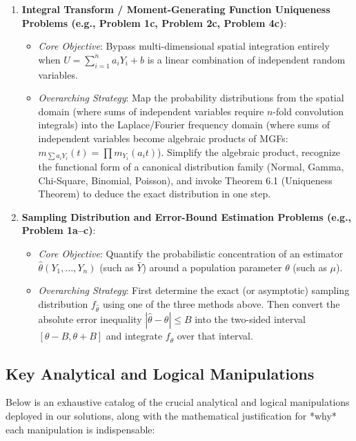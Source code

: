 \documentclass[11pt, letterpaper]{article}
\theoremstyle{definition}
\theoremstyle{remark}
\begin{document}
\begin{enumerate}[label=\textbf{\arabic*.}]
    \item \textbf{Integral Transform / Moment-Generating Function Uniqueness Problems (e.g., Problem 1c, Problem 2c, Problem 4c)}:
    \begin{itemize}
        \item \textit{Core Objective}: Bypass multi-dimensional spatial integration entirely when $U = \sum_{i=1}^n a_i Y_i + b$ is a linear combination of independent random variables.
        \item \textit{Overarching Strategy}: Map the probability distributions from the spatial domain (where sums of independent variables require $n$-fold convolution integrals) into the Laplace/Fourier frequency domain (where sums of independent variables become algebraic products of MGFs: $m_{\sum a_i Y_i}(t) = \prod m_{Y_i}(a_i t)$). Simplify the algebraic product, recognize the functional form of a canonical distribution family (Normal, Gamma, Chi-Square, Binomial, Poisson), and invoke Theorem 6.1 (Uniqueness Theorem) to deduce the exact distribution in one step.
    \end{itemize}

    \item \textbf{Sampling Distribution and Error-Bound Estimation Problems (e.g., Problem 1a--c)}:
    \begin{itemize}
        \item \textit{Core Objective}: Quantify the probabilistic concentration of an estimator $\hat{\theta}(Y_1, \dots, Y_n)$ (such as $\bar{Y}$) around a population parameter $\theta$ (such as $\mu$).
        \item \textit{Overarching Strategy}: First determine the exact (or asymptotic) sampling distribution $f_{\hat{\theta}}$ using one of the three methods above. Then convert the absolute error inequality $|\hat{\theta} - \theta| \le B$ into the two-sided interval $[\theta - B, \theta + B]$ and integrate $f_{\hat{\theta}}$ over that interval.
    \end{itemize}
\end{enumerate}

\subsection{Key Analytical and Logical Manipulations}

Below is an exhaustive catalog of the crucial analytical and logical manipulations deployed in our solutions, along with the mathematical justification for *why* each manipulation is indispensable:
\end{document}
